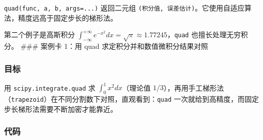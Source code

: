 \texttt{quad(func,\ a,\ b,\ args=...)} 返回二元组
\texttt{(积分值,\ 误差估计)}。它使用自适应算法，精度远高于固定步长的梯形法。

\begin{Shaded}
\begin{Highlighting}[]

\OperatorTok{=}\OperatorTok{**}\NormalTok{, }\NormalTok{, }\NormalTok{)}
\OperatorTok{=}\OperatorTok{{-}}\OperatorTok{**}\NormalTok{), }\OperatorTok{{-}}
\NormalTok{(}\SpecialCharTok{\{}\SpecialStringTok{, }\SpecialCharTok{\{}\NormalTok{)}
\NormalTok{(}\SpecialCharTok{\{}\SpecialStringTok{, }\SpecialCharTok{\{}\NormalTok{)}
\end{Highlighting}
\end{Shaded}

\begin{Shaded}
\begin{Highlighting}[]
\end{Highlighting}
\end{Shaded}

第二个例子是高斯积分
\(\int_{-\infty}^{+\infty} e^{-x^2} dx = \sqrt{\pi}\approx1.77245\)，\texttt{quad}
也擅长处理无穷积分。 \#\#\# 案例卡 1：用 quad
求定积分并和数值微积分结果对照

\subsubsection{目标}\label{ux76eeux6807-14}

用 \texttt{scipy.integrate.quad} 求 \(\int_0^1 x^2 dx\)（理论值
\(1/3\)），再用手工梯形法（\texttt{trapezoid}）在不同分割数下对照，直观看到：\texttt{quad}
一次就给到高精度，而固定步长梯形法需要不断加密才能靠近。

\subsubsection{代码}\label{ux4ee3ux7801-16}

